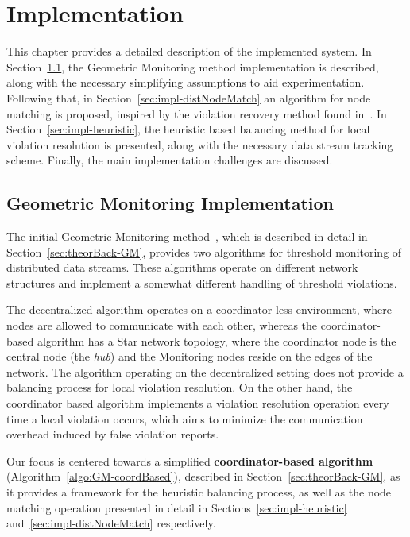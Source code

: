 \chapter{Implementation} \label{chap:impl}

This chapter provides a detailed description of the implemented system. In Section~\ref{sec:impl-GM}, the Geometric Monitoring method implementation is described, along with the necessary simplifying assumptions to aid experimentation. Following that, in Section~\ref{sec:impl-distNodeMatch} an algorithm for node matching is proposed, inspired by the violation recovery method found in~\cite{Keren2014GMHetStreams}. In Section~\ref{sec:impl-heuristic}, the heuristic based balancing method for local violation resolution is presented, along with the necessary data stream tracking scheme. Finally, the main implementation challenges are discussed.

\section{Geometric Monitoring Implementation} \label{sec:impl-GM}

The initial Geometric Monitoring method~\cite{Sharfman2006GM}, which is described in detail in Section~\ref{sec:theorBack-GM}, provides two algorithms for threshold monitoring of distributed data streams. These algorithms operate on different network structures and implement a somewhat different handling of threshold violations.

The decentralized algorithm operates on a coordinator-less environment, where nodes are allowed to communicate with each other, whereas the coordinator-based algorithm has a Star network topology, where the coordinator node is the central node (the \emph{hub}) and the Monitoring nodes reside on the edges of the network.
The algorithm operating on the decentralized setting does not provide a balancing process for local violation resolution. On the other hand, the coordinator based algorithm implements a violation resolution operation every time a local violation occurs, which aims to minimize the communication overhead induced by false violation reports. 

Our focus is centered towards a simplified \textbf{coordinator-based algorithm} (Algorithm~\ref{algo:GM-coordBased}), described in Section~\ref{sec:theorBack-GM}, as it provides a framework for the heuristic balancing process, as well as the node matching operation presented in detail in Sections~\ref{sec:impl-heuristic} and~\ref{sec:impl-distNodeMatch} respectively.

